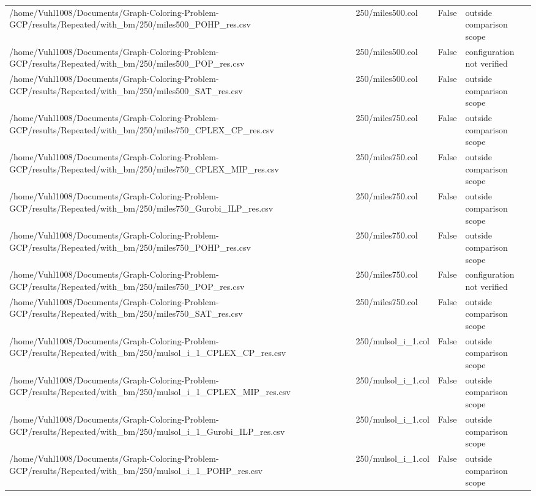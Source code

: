 \begin{table}[htbp]
\begin{tabular}{llll}
/home/Vuhl1008/Documents/Graph-Coloring-Problem-GCP/results/Repeated/with\_bm/250/miles500\_POHP\_res.csv & 250/miles500.col & False & outside comparison scope \\
/home/Vuhl1008/Documents/Graph-Coloring-Problem-GCP/results/Repeated/with\_bm/250/miles500\_POP\_res.csv & 250/miles500.col & False & configuration not verified \\
/home/Vuhl1008/Documents/Graph-Coloring-Problem-GCP/results/Repeated/with\_bm/250/miles500\_SAT\_res.csv & 250/miles500.col & False & outside comparison scope \\
/home/Vuhl1008/Documents/Graph-Coloring-Problem-GCP/results/Repeated/with\_bm/250/miles750\_CPLEX\_CP\_res.csv & 250/miles750.col & False & outside comparison scope \\
/home/Vuhl1008/Documents/Graph-Coloring-Problem-GCP/results/Repeated/with\_bm/250/miles750\_CPLEX\_MIP\_res.csv & 250/miles750.col & False & outside comparison scope \\
/home/Vuhl1008/Documents/Graph-Coloring-Problem-GCP/results/Repeated/with\_bm/250/miles750\_Gurobi\_ILP\_res.csv & 250/miles750.col & False & outside comparison scope \\
/home/Vuhl1008/Documents/Graph-Coloring-Problem-GCP/results/Repeated/with\_bm/250/miles750\_POHP\_res.csv & 250/miles750.col & False & outside comparison scope \\
/home/Vuhl1008/Documents/Graph-Coloring-Problem-GCP/results/Repeated/with\_bm/250/miles750\_POP\_res.csv & 250/miles750.col & False & configuration not verified \\
/home/Vuhl1008/Documents/Graph-Coloring-Problem-GCP/results/Repeated/with\_bm/250/miles750\_SAT\_res.csv & 250/miles750.col & False & outside comparison scope \\
/home/Vuhl1008/Documents/Graph-Coloring-Problem-GCP/results/Repeated/with\_bm/250/mulsol\_i\_1\_CPLEX\_CP\_res.csv & 250/mulsol\_i\_1.col & False & outside comparison scope \\
/home/Vuhl1008/Documents/Graph-Coloring-Problem-GCP/results/Repeated/with\_bm/250/mulsol\_i\_1\_CPLEX\_MIP\_res.csv & 250/mulsol\_i\_1.col & False & outside comparison scope \\
/home/Vuhl1008/Documents/Graph-Coloring-Problem-GCP/results/Repeated/with\_bm/250/mulsol\_i\_1\_Gurobi\_ILP\_res.csv & 250/mulsol\_i\_1.col & False & outside comparison scope \\
/home/Vuhl1008/Documents/Graph-Coloring-Problem-GCP/results/Repeated/with\_bm/250/mulsol\_i\_1\_POHP\_res.csv & 250/mulsol\_i\_1.col & False & outside comparison scope \\

\end{tabular}
\end{table}
